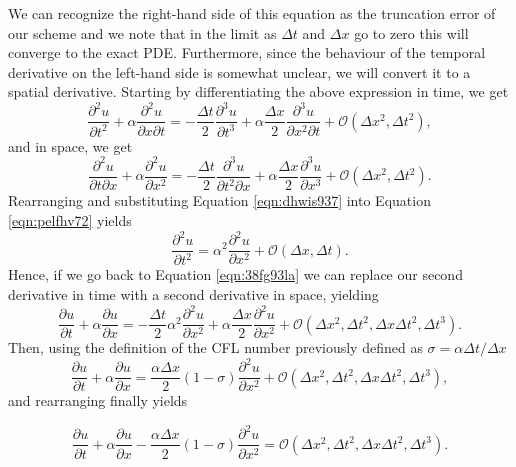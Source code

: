 We can recognize the right-hand side of this equation as the truncation error of our scheme and we note that in the limit as $\Delta t$ and $\Delta x$ go to zero this will converge to the exact PDE. Furthermore, since the behaviour of the temporal derivative on the left-hand side is somewhat unclear, we will convert it to a spatial derivative. Starting by differentiating the above expression in time, we get
\begin{equation}
	\label{eqn:pelfhv72}
	\frac{\partial^2 u}{\partial t^2} + \alpha \frac{\partial^2 u}{\partial x \partial t} = -\frac{\Delta t}{2} \frac{\partial^3 u}{\partial t^3} + \alpha \frac{\Delta x}{2} \frac{\partial^3 u}{\partial x^2 \partial t} + \mathcal{O}(\Delta x^2,\Delta t^2),
\end{equation}
and in space, we get
\begin{equation}
	\label{eqn:dhwis937}
	\frac{\partial^2 u}{\partial t \partial x} + \alpha \frac{\partial^2 u}{\partial x^2} = -\frac{\Delta t}{2} \frac{\partial^3 u}{\partial t^2 \partial x} + \alpha \frac{\Delta x}{2} \frac{\partial^3 u}{\partial x^3} + \mathcal{O}(\Delta x^2,\Delta t^2).
\end{equation}
Rearranging and substituting Equation \ref{eqn:dhwis937} into Equation \ref{eqn:pelfhv72} yields
\begin{equation}
	\frac{\partial^2 u}{\partial t^2} = \alpha^2 \frac{\partial^2 u}{\partial x^2} + \mathcal{O}(\Delta x,\Delta t).
\end{equation}
Hence, if we go back to Equation \ref{eqn:38fg93la} we can replace our second derivative in time with a second derivative in space, yielding
\begin{equation}
	\label{eqn:38fg93la}
	\frac{\partial u}{\partial t} + \alpha \frac{\partial u}{\partial x} = -\frac{\Delta t}{2} \alpha^2 \frac{\partial^2 u}{\partial x^2} + \alpha \frac{\Delta x}{2} \frac{\partial^2 u}{\partial x^2} + \mathcal{O}(\Delta x^2,\Delta t^2,\Delta x\Delta t^2,\Delta t^3).
\end{equation}
Then, using the definition of the CFL number previously defined as $\sigma = \alpha \Delta t / \Delta x$
\begin{equation}
	\frac{\partial u}{\partial t} + \alpha \frac{\partial u}{\partial x} = \frac{\alpha \Delta x}{2}(1-\sigma) \frac{\partial^2 u}{\partial x^2} + \mathcal{O}(\Delta x^2,\Delta t^2,\Delta x\Delta t^2,\Delta t^3),
\end{equation}
and rearranging finally yields
\begin{eqBox}
\begin{equation}
	\label{eqn:shrj986g}
	\frac{\partial u}{\partial t} + \alpha \frac{\partial u}{\partial x} - \frac{\alpha \Delta x}{2}(1-\sigma) \frac{\partial^2 u}{\partial x^2} = \mathcal{O}(\Delta x^2,\Delta t^2,\Delta x\Delta t^2,\Delta t^3).
\end{equation}
\end{eqBox}

